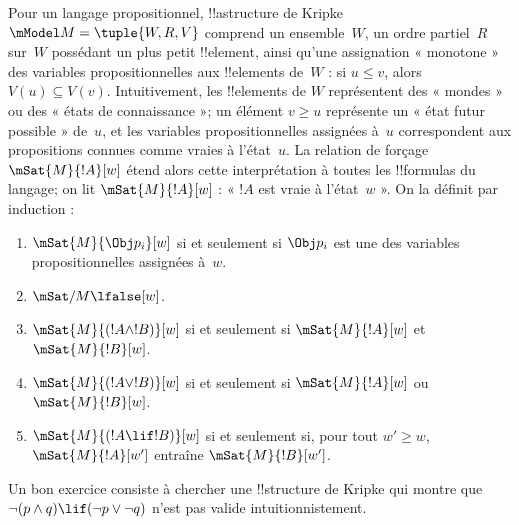 \documentclass[../../../include/open-logic-section]{subfiles}
\begin{document}
Pour un langage propositionnel, !!a{structure} de Kripke
$\mModel M = \tuple{W, R, V}$ comprend un ensemble~$W$, un ordre
partiel~$R$ sur~$W$ possédant un plus petit !!{element}, ainsi
qu'une assignation « monotone » des variables propositionnelles
aux !!{element}s de~$W$ : si $u\le v$, alors $V(u)\subseteq V(v)$. Intuitivement, les !!{element}s de $W$
représentent des « mondes » ou des « états de connaissance »;
un élément $v \geq u$ représente un « état futur possible »
de~$u$, et les variables propositionnelles assignées à~$u$
correspondent aux propositions connues comme vraies à l'état~$u$.
La relation de forçage $\mSat{M}{!A}[w]$ étend alors cette
interprétation à toutes les !!{formula}s du langage; on lit
$\mSat{M}{!A}[w]$ : « $!A$ est vraie à l'état~$w$ ».
On la définit par induction :
\begin{enumerate}
\item $\mSat{M}{\Obj p_i}[w]$ si et seulement si $\Obj p_i$
  est une des variables propositionnelles assignées à~$w$.
\item $\mSat/{M}{\lfalse}[w]$.
\item $\mSat{M}{(!A \land !B)}[w]$ si et seulement si
  $\mSat{M}{!A}[w]$ et $\mSat{M}{!B}[w]$.
\item $\mSat{M}{(!A \lor !B)}[w]$ si et seulement si
  $\mSat{M}{!A}[w]$ ou $\mSat{M}{!B}[w]$.
\item $\mSat{M}{(!A \lif !B)}[w]$ si et seulement si,
  pour tout $w' \geq w$, $\mSat{M}{!A}[w']$ entraîne
  $\mSat{M}{!B}[w']$.
\end{enumerate}
Un bon exercice consiste à chercher une !!{structure} de Kripke
qui montre que $\lnot (p \land q) \lif
(\lnot p \lor \lnot q)$ n'est pas valide intuitionnistement.
\end{document}
